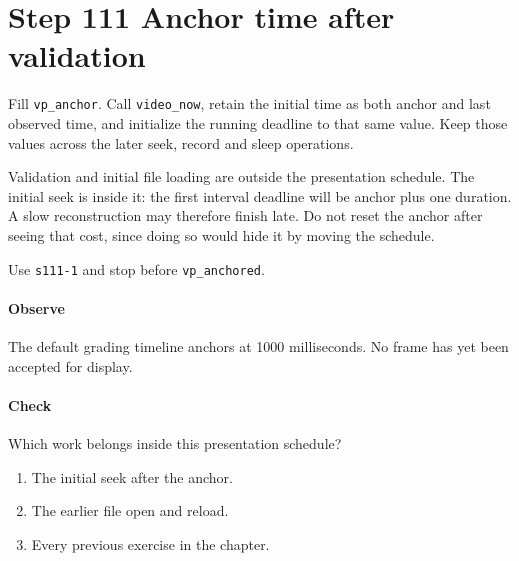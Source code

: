 \section{Step 111 Anchor time after validation}
Fill \texttt{vp\_anchor}. Call \texttt{video\_now}, retain the initial time as both anchor and last observed time, and initialize the running deadline to that same value. Keep those values across the later seek, record and sleep operations.

Validation and initial file loading are outside the presentation schedule. The initial seek is inside it: the first interval deadline will be anchor plus one duration. A slow reconstruction may therefore finish late. Do not reset the anchor after seeing that cost, since doing so would hide it by moving the schedule.

Use \texttt{s111-1} and stop before \texttt{vp\_anchored}.

\paragraph{Observe} The default grading timeline anchors at 1000 milliseconds. No frame has yet been accepted for display.

\paragraph{Check} Which work belongs inside this presentation schedule?
\begin{enumerate}[label=\Alph*.]
  \item The initial seek after the anchor.
  \item The earlier file open and reload.
  \item Every previous exercise in the chapter.
\end{enumerate}
